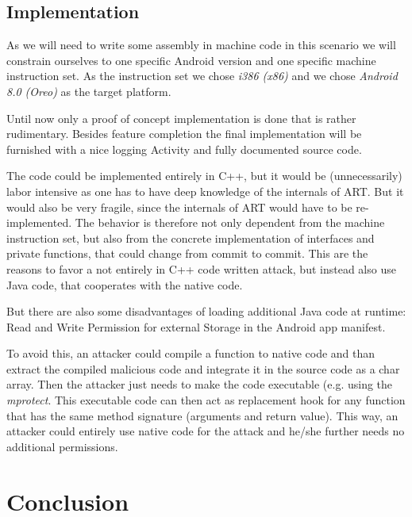 \subsection{Implementation}

As we will need to write some assembly in machine code in this scenario we will 
constrain ourselves to one specific Android version and one specific machine instruction set. As the instruction set we  chose \emph{i386 (x86)} and 
we chose \emph{Android 8.0 (Oreo)} as the target platform.

Until now only a proof of concept implementation is done that is rather rudimentary. 
Besides feature completion the final implementation will be furnished with a nice logging Activity and fully documented source code. 

The code could be implemented entirely in C++, but it would be (unnecessarily) labor intensive as one has to have deep knowledge of the internals of ART. But it would also be very fragile, since the internals of ART would have to be re-implemented. The behavior is therefore not only dependent from  the machine instruction set, but also from the concrete implementation of interfaces and private functions, that could change from commit to commit.
This are the reasons to favor a not entirely in C++ code written attack, but instead also use Java code, that cooperates with the native code.

But there are also some disadvantages of loading additional Java code at runtime: Read and Write Permission for external Storage in the Android app manifest. 

 To avoid this, an attacker could compile a function to native code and than extract the compiled malicious code and integrate it in the source code as a char array. Then the attacker just needs to make the code executable (e.g. using the \textit{mprotect}. This executable code can then act as replacement hook for any function that has the same method signature (arguments and return value).
 This way, an attacker could entirely use native code for the attack and he/she further needs no additional permissions.
\section{Conclusion}